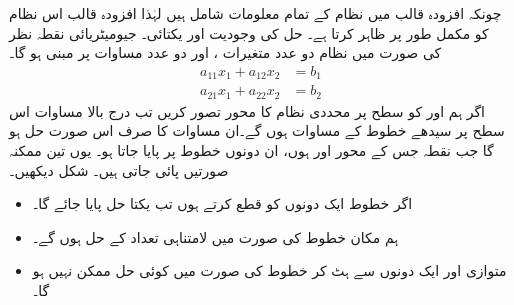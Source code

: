 چونکہ افزودہ قالب میں نظام  کے تمام معلومات شامل ہیں لہٰذا افزودہ قالب اس نظام کو مکمل طور پر ظاہر کرتا ہے۔
\quad حل کی وجودیت اور یکتائی۔ جیومیٹریائی نقطہ نظر\\
 کی صورت میں نظام دو عدد متغیرات ،  اور دو عدد مساوات پر مبنی ہو گا۔
\begin{align*}
a_{11}x_1+a_{12}x_2&=b_1\\
a_{21}x_1+a_{22}x_2&=b_2
\end{align*}
اگر ہم  اور   کو سطح  پر  محددی نظام کا محور  تصور  کریں تب درج بالا مساوات اس سطح پر سیدھے خطوط کے مساوات ہوں گے۔ان مساوات کا صرف اس صورت حل  ہو گا جب نقطہ  جس کے محور  اور  ہوں، ان دونوں خطوط پر پایا جاتا ہو۔ یوں تین ممکنہ صورتیں پائی جاتی ہیں۔ شکل  دیکھیں۔
\begin{itemize}
\item
اگر خطوط ایک دونوں کو قطع کرتے ہوں تب یکتا حل پایا جائے گا۔
\item
ہم مکان خطوط کی صورت میں لامتناہی تعداد کے حل ہوں گے۔
\item
متوازی اور ایک دونوں سے ہٹ کر خطوط کی صورت میں کوئی حل ممکن نہیں ہو گا۔
\end{itemize}
%
